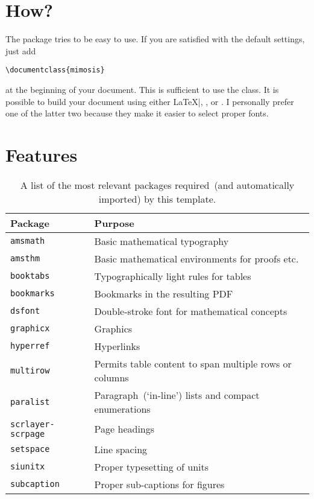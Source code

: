 \section{How?}

The package tries to be easy to use. If you are satisfied with the
default settings, just add
%
\begin{verbatim}
\documentclass{mimosis}
\end{verbatim}
%
at the beginning of your document. This is sufficient to use the class.
It is possible to build your document using either \LaTeX|, \XeLaTeX, or
\LuaLaTeX. I personally prefer one of the latter two because they make
it easier to select proper fonts.

\section{Features}

\begin{table}
  \centering
  \begin{tabular}{ll}
    \toprule
    \textbf{Package}      & \textbf{Purpose}\\
    \midrule
      \texttt{amsmath}          & Basic mathematical typography\\
      \texttt{amsthm}           & Basic mathematical environments for proofs etc.\\
      \texttt{booktabs}         & Typographically light rules for tables\\
      \texttt{bookmarks}        & Bookmarks in the resulting PDF\\
      \texttt{dsfont}           & Double-stroke font for mathematical concepts\\
      \texttt{graphicx}         & Graphics\\
      \texttt{hyperref}         & Hyperlinks\\
      \texttt{multirow}         & Permits table content to span multiple rows or columns\\
      \texttt{paralist}         & Paragraph~(`in-line') lists and compact enumerations\\
      \texttt{scrlayer-scrpage} & Page headings\\
      \texttt{setspace}         & Line spacing\\
      \texttt{siunitx}          & Proper typesetting of units\\
      \texttt{subcaption} & Proper sub-captions for figures\\
    \bottomrule
  \end{tabular}
  \caption{%
    A list of the most relevant packages required~(and automatically imported) by this template.
  }
  \label{tab:Packages}
\end{table}

